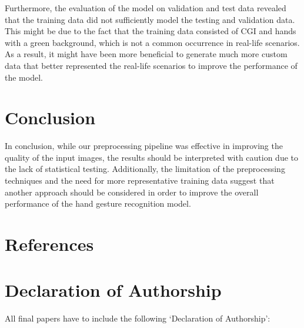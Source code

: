\documentclass[a4paper]{article}
\begin{document}
Furthermore, the evaluation of the model on validation and test data revealed that the training data did not sufficiently model the testing and validation data. This might be due to the fact that the training data consisted of CGI and hands with a green background, which is not a common occurrence in real-life scenarios. As a result, it might have been more beneficial to generate much more custom data that better represented the real-life scenarios to improve the performance of the model.

\section{Conclusion}

In conclusion, while our preprocessing pipeline was effective in improving the quality of the input images, the results should be interpreted with caution due to the lack of statistical testing. Additionally, the limitation of the preprocessing techniques and the need for more representative training data suggest that another approach should be considered in order to improve the overall performance of the hand gesture recognition model.

\newpage

\section*{References}







\section*{Declaration of Authorship}
All final papers have to include the following ‘Declaration of Authorship’:
\end{document}
